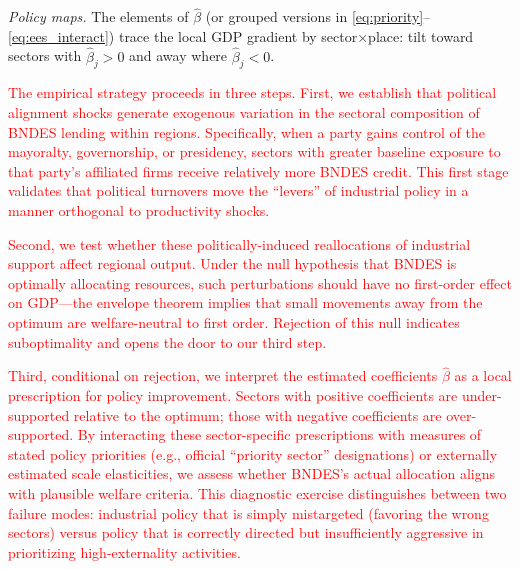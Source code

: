 \documentclass{article}
\begin{document}
\emph{Policy maps.}
The elements of $\hat\beta$ (or grouped versions in \eqref{eq:priority}–\eqref{eq:ees_interact}) trace the local GDP gradient by sector×place:
tilt toward sectors with $\hat\beta_j>0$ and away where $\hat\beta_j<0$.


\textcolor{red}{The empirical strategy proceeds in three steps. First, we establish that political alignment shocks generate exogenous variation in the sectoral composition of BNDES lending within regions. Specifically, when a party gains control of the mayoralty, governorship, or presidency, sectors with greater baseline exposure to that party's affiliated firms receive relatively more BNDES credit. This first stage validates that political turnovers move the ``levers'' of industrial policy in a manner orthogonal to productivity shocks.}

\textcolor{red}{Second, we test whether these politically-induced reallocations of industrial support affect regional output. Under the null hypothesis that BNDES is optimally allocating resources, such perturbations should have no first-order effect on GDP---the envelope theorem implies that small movements away from the optimum are welfare-neutral to first order. Rejection of this null indicates suboptimality and opens the door to our third step.}

\textcolor{red}{Third, conditional on rejection, we interpret the estimated coefficients $\hat{\beta}$ as a local prescription for policy improvement. Sectors with positive coefficients are under-supported relative to the optimum; those with negative coefficients are over-supported. By interacting these sector-specific prescriptions with measures of stated policy priorities (e.g., official ``priority sector'' designations) or externally estimated scale elasticities, we assess whether BNDES's actual allocation aligns with plausible welfare criteria. This diagnostic exercise distinguishes between two failure modes: industrial policy that is simply mistargeted (favoring the wrong sectors) versus policy that is correctly directed but insufficiently aggressive in prioritizing high-externality activities.}
\end{document}
